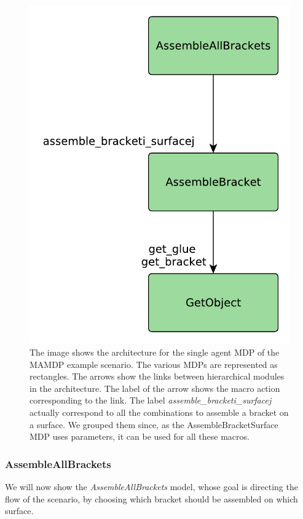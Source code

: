 \begin{figure}[ht!]
	\centering
	\includegraphics[scale=0.5]{img/coworker/mamdp/scenario_single_architecture.pdf}
	\caption[MAMDP example: single MDP model]{The image shows the architecture for the single agent MDP of the MAMDP example scenario. The various MDPs are represented as rectangles. The arrows show the links between hierarchical modules in the architecture. The label of the arrow shows the macro action corresponding to the link. The label \textit{assemble\_bracketi\_surfacej} actually correspond to all the combinations to assemble a bracket on a surface. We grouped them since, as the AssembleBracketSurface MDP uses parameters, it can be used for all these macros.}
	\label{fig:mamdp-scenario_single_architecture}
\end{figure}



\subsubsection{AssembleAllBrackets}
We will now show the \textit{AssembleAllBrackets} model, whose goal is directing the flow of the scenario, by choosing which bracket should be assembled on which surface.

